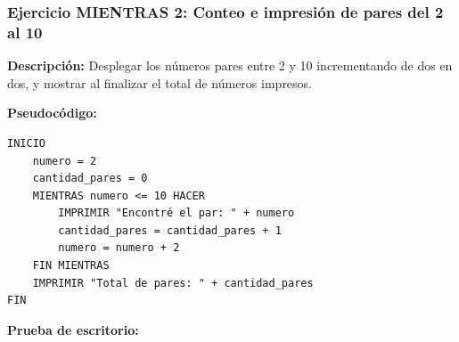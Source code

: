 \subsubsection{Ejercicio MIENTRAS 2: Conteo e impresión de pares del 2
al
10}\label{ejercicio-mientras-2-conteo-e-impresiuxf3n-de-pares-del-2-al-10}

\textbf{Descripción:} Desplegar los números pares entre 2 y 10
incrementando de dos en dos, y mostrar al finalizar el total de números
impresos.

\textbf{Pseudocódigo:}

\begin{verbatim}
INICIO
    numero = 2
    cantidad_pares = 0
    MIENTRAS numero <= 10 HACER
        IMPRIMIR "Encontré el par: " + numero
        cantidad_pares = cantidad_pares + 1
        numero = numero + 2
    FIN MIENTRAS
    IMPRIMIR "Total de pares: " + cantidad_pares
FIN
\end{verbatim}



\textbf{Prueba de escritorio:}


